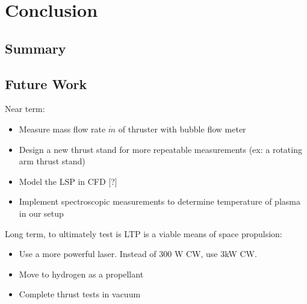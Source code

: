 \chapter{Conclusion}

    \section{Summary}


    \section{Future Work}

        Near term:

        \begin{itemize}
            \item Measure mass flow rate $\dot m$ of thruster with bubble flow meter
            \item Design a new thrust stand for more repeatable measurements (ex: a rotating arm thrust stand)
            \item Model the LSP in CFD [?]
            \item Implement spectroscopic measurements to determine temperature of plasma in our setup
        \end{itemize}

        Long term, to ultimately test is LTP is a viable means of space propulsion:

        \begin{itemize}
            \item Use a more powerful laser. Instead of 300 W CW, use 3kW CW.
            \item Move to hydrogen as a propellant
            \item Complete thrust tests in vacuum
        \end{itemize}


        
        
        
        
        
        
        
        
 
